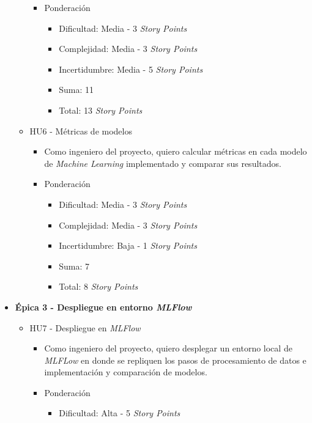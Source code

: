 \documentclass[
11pt, %
]{charter}
\begin{document}
\begin{itemize}
\begin{itemize}
\begin{itemize}
            \item Ponderación
            \begin{itemize}
                \item Dificultad: Media - 3 \textit{Story Points}
                \item Complejidad: Media - 3 \textit{Story Points}
                \item Incertidumbre: Media - 5 \textit{Story Points}
                \item Suma: 11
                \item Total: 13 \textit{Story Points}
            \end{itemize}
        \end{itemize}
      \item HU6 - Métricas de modelos
        \begin{itemize}
            \item Como ingeniero del proyecto, quiero calcular métricas en cada modelo de \textit{Machine Learning} implementado y comparar sus resultados.
            \item Ponderación
            \begin{itemize}
                \item Dificultad: Media - 3 \textit{Story Points}
                \item Complejidad: Media - 3 \textit{Story Points}
                \item Incertidumbre: Baja - 1 \textit{Story Points}
                \item Suma: 7
                \item Total: 8 \textit{Story Points}
            \end{itemize}
        \end{itemize}
    \end{itemize}
  \item \textbf{\'{E}pica 3 - Despliegue en entorno \textit{MLFlow}}
    \begin{itemize}
      \item HU7 - Despliegue en \textit{MLFlow}
        \begin{itemize}
            \item Como ingeniero del proyecto, quiero desplegar un entorno local de \textit{MLFLow} en donde se repliquen los pasos de procesamiento de datos e implementación y comparación de modelos.
            \item Ponderación
            \begin{itemize}
                \item Dificultad: Alta - 5 \textit{Story Points}

\end{itemize}
\end{itemize}
\end{itemize}
\end{itemize}
\end{document}
